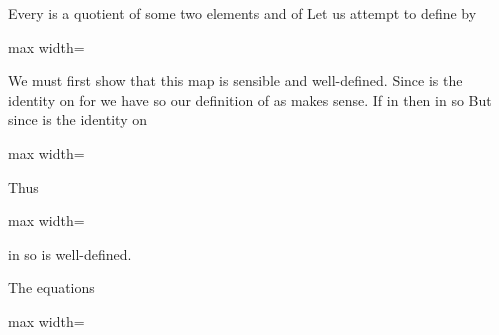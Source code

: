 \documentclass[11pt,oneside]{article}
\begin{document}
\BookNarrativetrue

\begin{BookBody}

\noindent Every  is a quotient  of some two elements  and  of  Let us attempt to define \BookInline{\psi } by

\begin{center}\begin{adjustbox}{max width=\linewidth}\end{adjustbox}\end{center}

\noindent We must first show that this map \BookInline{\psi } is sensible and well-defined. Since \BookInline{\psi } is the identity on  for  we have  so our definition of  as  makes sense. If  in  then  in  so  But since \BookInline{\psi } is the identity on 

\begin{center}\begin{adjustbox}{max width=\linewidth}\end{adjustbox}\end{center}

\noindent Thus

\begin{center}\begin{adjustbox}{max width=\linewidth}\end{adjustbox}\end{center}

\noindent in  so \BookInline{\psi } is well-defined.

The equations

\begin{center}\begin{adjustbox}{max width=\linewidth}\end{adjustbox}\end{center}


\end{BookBody}
\end{document}
